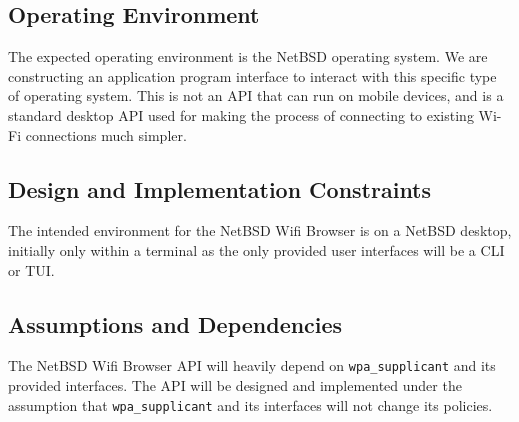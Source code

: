 \subsection{Operating Environment}
The expected operating environment is the NetBSD operating system. We are constructing an application program interface to 
interact with this specific type of operating system. This is not an API that can run on mobile devices, and is a standard 
desktop API used for making the process of connecting to existing Wi-Fi connections much simpler. 

\subsection{Design and Implementation Constraints}
The intended environment for the NetBSD Wifi Browser is on a NetBSD desktop,
initially only within a terminal as the only provided user interfaces will be
a CLI or TUI.

\subsection{Assumptions and Dependencies}
%
The NetBSD Wifi Browser API will heavily depend on \texttt{wpa\_supplicant} and its
provided interfaces. The API will be designed and implemented under the assumption
that \texttt{wpa\_supplicant} and its interfaces will not change its policies.
